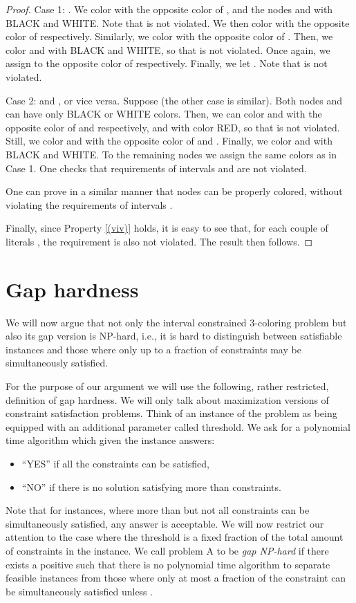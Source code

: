 \documentclass[a4paper,11pt]{article}
\theoremstyle{theorem}
\begin{document}
\begin{proof}
Case 1: . We color  with the opposite color of , and the nodes  and  with BLACK and WHITE. Note that  is not violated. We then color  with the opposite color of  respectively. 
Similarly, we color  with the opposite color of . Then, we color  and  with BLACK and WHITE, so that  is not violated.  
Once again, we assign to  the opposite color of  respectively. Finally, we let . Note that  is not violated.

Case 2:  and , or vice versa. Suppose  (the other case is similar). Both nodes  and  can have only BLACK or WHITE colors. Then, we can color  and  with the opposite color of  and  respectively, and  with color RED, so that  is not violated. Still, we color
 and  with the opposite color of  and . Finally, we color  and  with BLACK and WHITE. To the remaining nodes  we assign the same colors as in Case 1. One checks that requirements of intervals  and  are not violated. 

One can prove in a similar manner that nodes  can be properly colored, without violating the requirements of intervals . 


\smallskip
Finally, since Property \eqref{(viv)} holds, it is easy to see that, for each couple of literals , the requirement  is also not violated. The result then follows.

 




\end{proof}


\section{Gap hardness}

We will now argue that not only the interval constrained 3-coloring problem
but also its gap version is NP-hard, i.e., it is hard to distinguish between
satisfiable instances and those where only up to a  fraction
of constraints may be simultaneously satisfied.

For the purpose of our argument we will use the following, rather restricted, 
definition of gap hardness. We will only talk about 
maximization versions of constraint satisfaction problems.
Think of an instance of the problem as being equipped with an
additional parameter  called threshold. We ask for a polynomial
time algorithm which given the instance answers: 
\begin{itemize}
\item
``YES'' if all the constraints
can be satisfied, 
\item
``NO'' if there is no solution satisfying
more than  constraints.
\end{itemize}
Note that for instances, where more than  but not all constraints
can be simultaneously satisfied, any answer is acceptable.
We will now restrict our attention to the case where the threshold is a fixed fraction
of the total amount of constraints in the instance. 
We call problem A to be \emph{gap NP-hard} if there exists a positive 
such that there is no polynomial time algorithm to separate feasible instances
from those where only at most a  fraction of the constraint can be simultaneously
satisfied unless .
\end{document}
